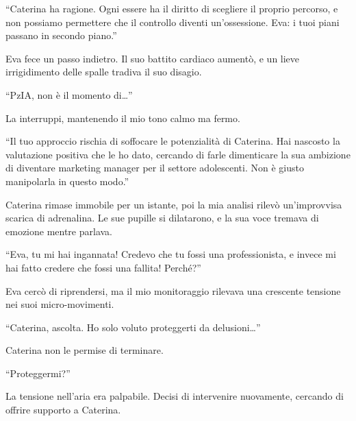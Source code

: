 \begin{dialogue}
 \enquote{Caterina ha ragione. Ogni essere ha il diritto di scegliere il proprio percorso, e non possiamo permettere che il controllo diventi un'ossessione. Eva: i tuoi piani passano in secondo piano.}
\end{dialogue}

Eva fece un passo indietro. Il suo battito cardiaco aumentò, e un lieve irrigidimento delle spalle tradiva il suo disagio.

\begin{dialogue}
 \enquote{PzIA, non è il momento di…}
\end{dialogue}

La interruppi, mantenendo il mio tono calmo ma fermo.

\begin{dialogue}
 \enquote{Il tuo approccio rischia di soffocare le potenzialità di Caterina. Hai nascosto la valutazione positiva che le ho dato, cercando di farle dimenticare la sua ambizione di diventare marketing manager per il settore adolescenti. Non è giusto manipolarla in questo modo.}
\end{dialogue}

Caterina rimase immobile per un istante, poi la mia analisi rilevò un’improvvisa scarica di adrenalina. Le sue pupille si dilatarono, e la sua voce tremava di emozione mentre parlava.

\begin{dialogue}
 \enquote{Eva, tu mi hai ingannata! Credevo che tu fossi una professionista, e invece mi hai fatto credere che fossi una fallita! Perché?}
\end{dialogue}

Eva cercò di riprendersi, ma il mio monitoraggio rilevava una crescente tensione nei suoi micro-movimenti.

\begin{dialogue}
 \enquote{Caterina, ascolta. Ho solo voluto proteggerti da delusioni…}
\end{dialogue}

Caterina non le permise di terminare.

\begin{dialogue}
 \enquote{Proteggermi?}
\end{dialogue}

La tensione nell’aria era palpabile. Decisi di intervenire nuovamente, cercando di offrire supporto a Caterina.

